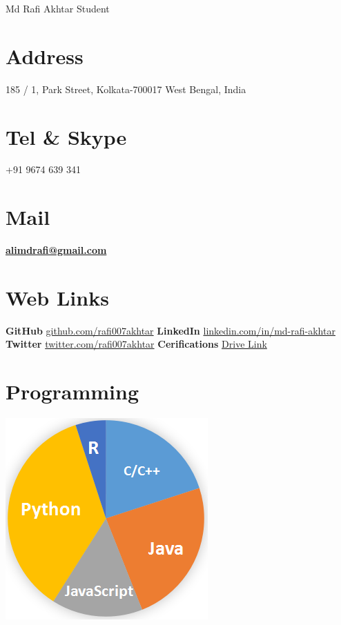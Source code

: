 \documentclass[]{friggeri-cv}
\begin{document}
\header {} {Md Rafi Akhtar}
      {Student}
      

\begin{aside}
  \section{Address}
    185 / 1, Park Street, Kolkata-700017
    West Bengal, India
    ~
  \section{Tel \& Skype}
    +91 9674 639 341
    ~
  \section{Mail}
    \href{mailto:alimdrafi.com}{\textbf{alimdrafi@gmail.com}}
    ~
  \section{Web Links}
    \textbf{GitHub} \href{https://github.com/rafi007akhtar}{github.com/rafi007akhtar}
    \textbf{LinkedIn} \href{https://www.linkedin.com/in/md-rafi-akhtar}{linkedin.com/in/md-rafi-akhtar}
    \textbf{Twitter} \href{https://twitter.com/rafi007akhtar}{twitter.com/rafi007akhtar}
    \textbf{Cerifications}
    \href{https://drive.google.com/open?id=1yXkhjvAwEwfuUrkH_Ks33mNrBGWDfhWL}{Drive Link}
    ~
  \section{Programming}
    \includegraphics[scale=0.5]{img/languages.png}
    ~

\end{aside}
\end{document}
